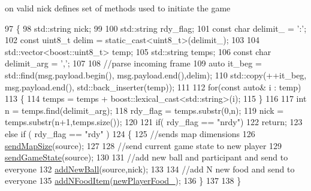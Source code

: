 on valid nick defines set of methods used to initiate the game 


\begin{DoxyCode}
97     \{
98         std::string nick;
99 
100         std::string rdy\_flag;
101         \textcolor{keyword}{const} \textcolor{keywordtype}{char} delimit\_ = \textcolor{charliteral}{':'};
102         \textcolor{keyword}{const} uint8\_t delim = \textcolor{keyword}{static\_cast<}uint8\_t\textcolor{keyword}{>}(delimit\_);
103 
104         std::vector<boost::uint8\_t> temp;
105         std::string temps;
106         \textcolor{keyword}{const} \textcolor{keywordtype}{char} delimit\_arg = \textcolor{charliteral}{','};
107 
108         \textcolor{comment}{//parse incoming frame}
109         \textcolor{keyword}{auto} it\_beg = std::find(msg.payload.begin(), msg.payload.end(),delim);
110         std::copy(++it\_beg, msg.payload.end(), std::back\_inserter(temp));
111 
112         \textcolor{keywordflow}{for}(\textcolor{keyword}{const} \textcolor{keyword}{auto}& i : temp)
113         \{
114             temps = temps +  boost::lexical\_cast<std::string>(i);
115         \}
116 
117         \textcolor{keywordtype}{int} n = temps.find(delimit\_arg);
118         rdy\_flag = temps.substr(0,n);
119         nick = temps.substr(n+1,temps.size());
120 
121         \textcolor{keywordflow}{if}( rdy\_flag == \textcolor{stringliteral}{"nrdy"})
122             \textcolor{keywordflow}{return};
123         \textcolor{keywordflow}{else} \textcolor{keywordflow}{if} ( rdy\_flag == \textcolor{stringliteral}{"rdy"} )
124         \{
125             \textcolor{comment}{//sends map dimensions}
126             \hyperlink{classwebsocket_1_1GameBoard_a93379a2caec9ae069ffef81472e608f9}{sendMapSize}(source);
127 
128             \textcolor{comment}{//send current game state to new player}
129             \hyperlink{classwebsocket_1_1GameBoard_a581a9aeb4f1e70892a70a238bba6469a}{sendGameState}(source);
130 
131             \textcolor{comment}{//add new ball and participant and send to everyone}
132             \hyperlink{classwebsocket_1_1GameBoard_a9067bf26d8aae3e4f325d866247e0951}{addNewBall}(source,nick);    
133 
134             \textcolor{comment}{//add N new food and send to everyone}
135             \hyperlink{classwebsocket_1_1GameBoard_a4bcaa4bcf0a260efa6baffec4e72990e}{addNFoodItem}(\hyperlink{classwebsocket_1_1GameBoard_aad2445e5c98fe42f37e71c15ca3c57c9}{newPlayerFood\_});
136         \}
137 
138     \}
\end{DoxyCode}
